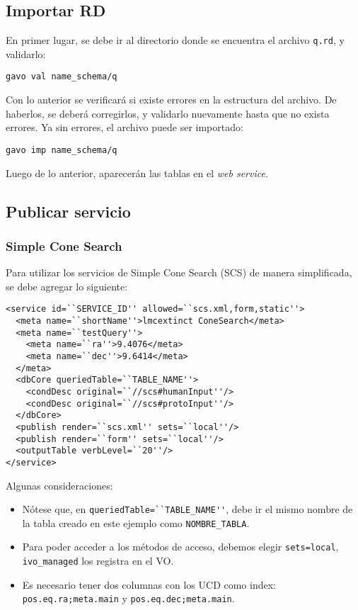 \subsection*{Importar RD}

En primer lugar, se debe ir al directorio donde se encuentra el archivo \verb;q.rd;, y validarlo:

\begin{verbatim}
gavo val name_schema/q
\end{verbatim}

Con lo anterior se verificará si existe errores en la estructura del archivo. De haberlos, se deberá corregirlos, y validarlo nuevamente hasta que no exista errores. Ya sin errores, el archivo puede ser importado:

\begin{verbatim}
gavo imp name_schema/q
\end{verbatim}

Luego de lo anterior, aparecerán las tablas en el \emph{web service}.

\subsection*{Publicar servicio}

\subsubsection*{Simple Cone Search}

Para utilizar los servicios de Simple Cone Search (SCS) de manera simplificada, se debe agregar lo siguiente:

\begin{verbatim}
<service id=``SERVICE_ID'' allowed=``scs.xml,form,static''>
  <meta name=``shortName''>lmcextinct ConeSearch</meta>
  <meta name=``testQuery''>
    <meta name=``ra''>9.4076</meta>
    <meta name=``dec''>9.6414</meta>
  </meta>
  <dbCore queriedTable=``TABLE_NAME''>
    <condDesc original=``//scs#humanInput''/>
    <condDesc original=``//scs#protoInput''/>
  </dbCore>
  <publish render=``scs.xml'' sets=``local''/>
  <publish render=``form'' sets=``local''/>
  <outputTable verbLevel=``20''/>
</service>
\end{verbatim}

Algunas consideraciones:

\begin{itemize}
	\item Nótese que, en \verb;queriedTable=``TABLE_NAME'';, debe ir el mismo nombre de la tabla creado en este ejemplo como \verb;NOMBRE_TABLA;.
	\item Para poder acceder a los métodos de acceso, debemos elegir \verb;sets=local;, \verb;ivo_managed; los registra en el VO.
	\item Es necesario tener dos columnas con los UCD como index: \verb:pos.eq.ra;meta.main: y \verb:pos.eq.dec;meta.main:.
\end{itemize}

